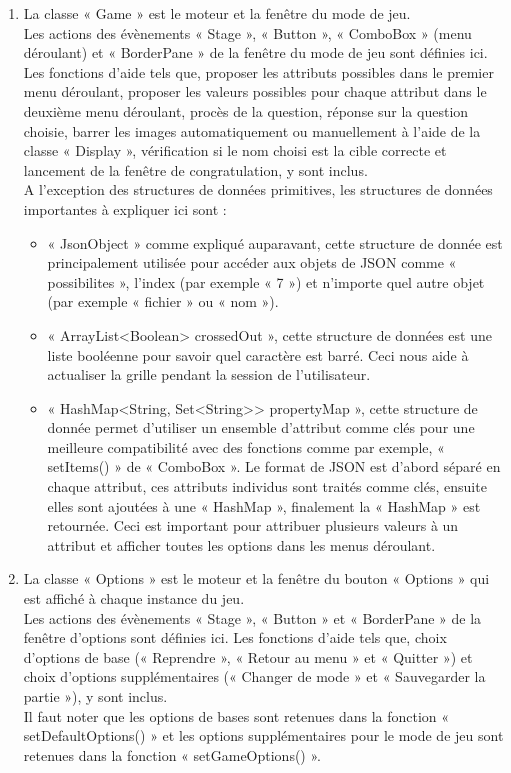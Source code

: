 \documentclass[a4paper]{article}
\begin{document}
\begin{enumerate}
 
    \item      La classe « Game » est le moteur et la fenêtre du mode de jeu.\\
    Les actions des évènements « Stage », « Button », « ComboBox » (menu déroulant) et « BorderPane » de la fenêtre du mode de jeu sont définies ici.
    Les fonctions d’aide tels que, proposer les attributs possibles dans le premier menu déroulant, proposer les valeurs possibles pour chaque attribut dans le deuxième menu déroulant, procès de la question, réponse sur la question choisie, barrer les images automatiquement ou manuellement à l’aide de la classe « Display », vérification si le nom choisi est la cible correcte et lancement de la fenêtre de congratulation, y sont inclus.\\
    A l’exception des structures de données primitives, les structures de données importantes à expliquer ici sont :
    \begin{itemize}
        \item « JsonObject » comme expliqué auparavant, cette structure de donnée est principalement utilisée pour accéder aux objets de JSON comme « possibilites », l’index (par exemple « 7 ») et n’importe quel autre objet (par exemple « fichier » ou « nom »).
        \item  « ArrayList<Boolean> crossedOut », cette structure de données est une liste booléenne pour savoir quel caractère est barré. Ceci nous aide à actualiser la grille pendant la session de l’utilisateur.
        \item « HashMap<String, Set<String>> propertyMap », cette structure de donnée permet d’utiliser un ensemble d’attribut comme clés pour une meilleure compatibilité avec des fonctions comme par exemple, « setItems() » de « ComboBox ». Le format de JSON est d’abord séparé en chaque attribut, ces attributs individus sont traités comme clés, ensuite elles sont ajoutées à une « HashMap », finalement la « HashMap » est retournée. Ceci est important pour attribuer plusieurs valeurs à un attribut et afficher toutes les options dans les menus déroulant.\\
    \end{itemize}
 


    \item      La classe « Options » est le moteur et la fenêtre du bouton « Options » qui est affiché à chaque instance du jeu.\\
    Les actions des évènements « Stage », « Button » et « BorderPane » de la fenêtre d’options sont définies ici. Les fonctions d’aide tels que, choix d’options de base (« Reprendre », « Retour au menu » et « Quitter ») et choix d’options supplémentaires (« Changer de mode » et « Sauvegarder la partie »), y sont inclus.\\
    Il faut noter que les options de bases sont retenues dans la fonction « setDefaultOptions() » et les options supplémentaires pour le mode de jeu sont retenues dans la fonction « setGameOptions() ».\\
    

\end{enumerate}
\end{document}
